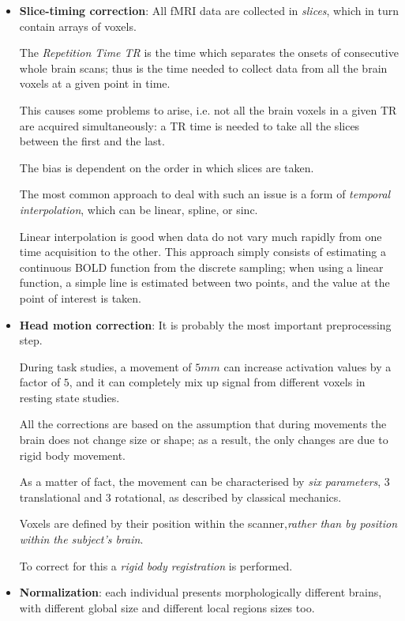 \documentclass[12pt,openright,twoside,a4paper]{book}
\begin{document}
\begin{itemize}
\item \textbf{Slice-timing correction}: All fMRI data are collected in \textit{slices}, which in turn contain arrays of voxels. 

The \textit{Repetition Time TR} is the time which separates the onsets of consecutive whole brain scans; thus is the time needed to collect data from all the brain voxels at a given point in time. 

This causes some problems to arise, i.e. not all the brain voxels in a given TR are acquired simultaneously: a TR time is needed to take all the slices between the first and the last. 

The bias is dependent on the order in which slices are taken. 

The most common approach to deal with such an issue is a form of \textit{temporal interpolation}, which can be linear, spline, or sinc. 

Linear interpolation is good when data do not vary much rapidly from one time acquisition to the other. This approach simply consists of estimating a continuous BOLD function from the discrete sampling; when using a linear function, a simple line is estimated between
two points, and the value at the point of interest is taken.

\item \textbf{Head motion correction}: It is probably the most important preprocessing step.

During task studies,  a movement of $5mm$ can increase activation values by a factor of $5$, and it can completely mix up signal from different voxels in resting state studies.

 All the corrections are based on the assumption that during movements the brain does not change size or shape; as a result, the only changes are due to rigid body movement. 
 
As a matter of fact, the movement can be characterised by \textit{six parameters}, 3 translational and 3 rotational, as described by classical mechanics. 
 
Voxels are defined by their position within the scanner,\textit{rather than by position within the subject’s brain}. 

To correct for this a \textit{rigid body registration} is performed.

\item \textbf{Normalization}: each individual presents morphologically different brains, with different global size and different local regions sizes  too. 


\end{itemize}
\end{document}
